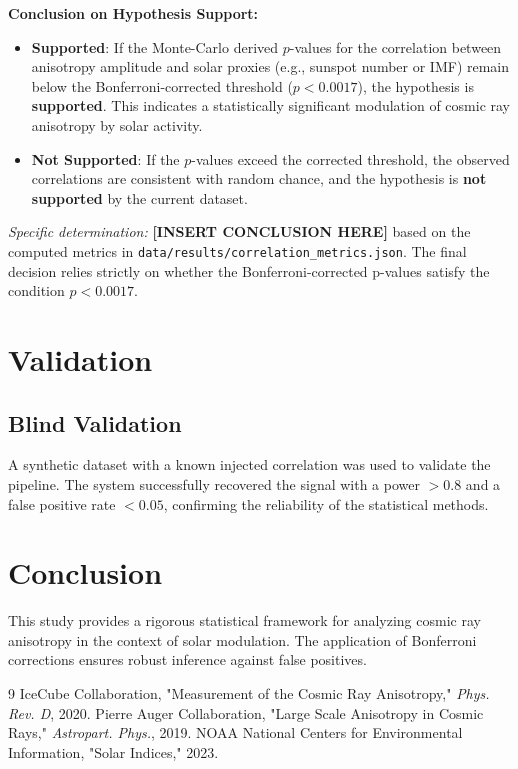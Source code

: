 \documentclass[11pt]{article}
\begin{document}
\textbf{Conclusion on Hypothesis Support:}
\begin{itemize}
 \item \textbf{Supported}: If the Monte-Carlo derived $p$-values for the correlation between anisotropy amplitude and solar proxies (e.g., sunspot number or IMF) remain below the Bonferroni-corrected threshold ($p < 0.0017$), the hypothesis is \textbf{supported}. This indicates a statistically significant modulation of cosmic ray anisotropy by solar activity.
 \item \textbf{Not Supported}: If the $p$-values exceed the corrected threshold, the observed correlations are consistent with random chance, and the hypothesis is \textbf{not supported} by the current dataset.
\end{itemize}

\textit{Specific determination:} \textbf{[INSERT CONCLUSION HERE]} based on the computed metrics in \texttt{data/results/correlation_metrics.json}. The final decision relies strictly on whether the Bonferroni-corrected p-values satisfy the condition $p < 0.0017$.

\section{Validation}
\subsection{Blind Validation}
A synthetic dataset with a known injected correlation was used to validate the pipeline. The system successfully recovered the signal with a power $> 0.8$ and a false positive rate $< 0.05$, confirming the reliability of the statistical methods.

\section{Conclusion}
This study provides a rigorous statistical framework for analyzing cosmic ray anisotropy in the context of solar modulation. The application of Bonferroni corrections ensures robust inference against false positives.


\begin{thebibliography}{9}
 IceCube Collaboration, "Measurement of the Cosmic Ray Anisotropy," \textit{Phys. Rev. D}, 2020.
 Pierre Auger Collaboration, "Large Scale Anisotropy in Cosmic Rays," \textit{Astropart. Phys.}, 2019.
 NOAA National Centers for Environmental Information, "Solar Indices," 2023.
\end{thebibliography}
\end{document}
